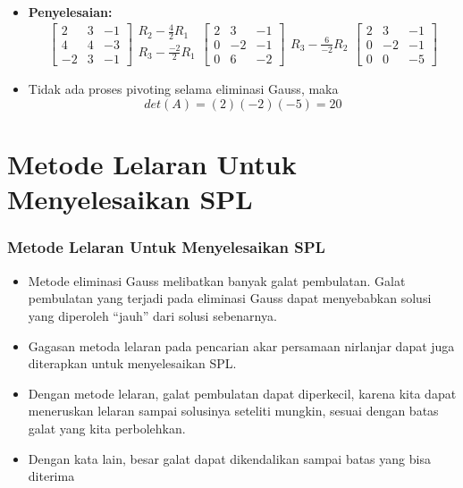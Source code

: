 \documentclass[pdflatex,compress,mathserif]{beamer}
\begin{document}
\begin{frame}
	\begin{itemize}
		\item \textbf{Penyelesaian:}
		\[ \begin{bmatrix}
		2 & 3 & -1 \\ 4 & 4 & -3 \\ -2 & 3 & -1
		\end{bmatrix}
		\begin{matrix}
		R_2 - \frac{4}{2}R_1 \\
		R_3 - \frac{-2}{2}R_1 \\
		\end{matrix}
		\begin{bmatrix}
		2 & 3 & -1 \\ 0 & -2 & -1 \\ 0 & 6 & -2
		\end{bmatrix}
		\begin{matrix}
		R_3 - \frac{6}{-2}R_2
		\end{matrix}
		\begin{bmatrix}
		2 & 3 & -1 \\ 0 & -2 & -1 \\ 0 & 0 & -5
		\end{bmatrix}
		\]
		\item Tidak ada proses pivoting selama eliminasi Gauss, maka
		\[ det(A) = (2) (-2) (-5) = 20 \]
	\end{itemize}
\end{frame}

\section{Metode Lelaran Untuk Menyelesaikan SPL}

\begin{frame}
	\frametitle{Metode Lelaran Untuk Menyelesaikan SPL}
	\begin{itemize}
		\item Metode eliminasi Gauss melibatkan banyak galat pembulatan. Galat pembulatan yang terjadi pada eliminasi Gauss dapat menyebabkan solusi yang diperoleh “jauh” dari solusi sebenarnya.
		\item Gagasan metoda lelaran pada pencarian akar persamaan nirlanjar dapat juga diterapkan untuk menyelesaikan SPL.
		\item Dengan metode lelaran, galat pembulatan dapat diperkecil, karena kita dapat meneruskan lelaran sampai solusinya seteliti mungkin, sesuai dengan batas galat yang kita perbolehkan.
		\item Dengan kata lain, besar galat dapat dikendalikan sampai batas yang bisa diterima
	\end{itemize}
\end{frame}
\end{document}
